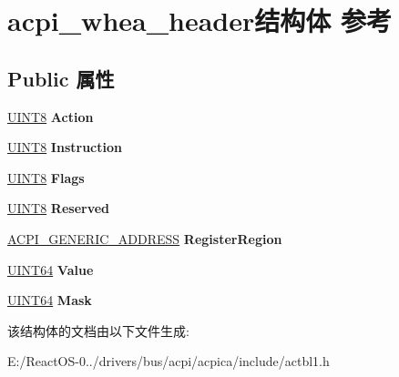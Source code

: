 \hypertarget{structacpi__whea__header}{}\section{acpi\+\_\+whea\+\_\+header结构体 参考}
\label{structacpi__whea__header}
\subsection*{Public 属性}
\begin{DoxyCompactItemize}
\item 
\mbox{\label{structacpi__whea__header_a15100555357763772a3dff52bd23ce2d}} 
\hyperlink{_processor_bind_8h_ab27e9918b538ce9d8ca692479b375b6a}{U\+I\+N\+T8} {\bfseries Action}
\item 
\mbox{\label{structacpi__whea__header_abcde372a29ea218d0800bd41bbd16935}} 
\hyperlink{_processor_bind_8h_ab27e9918b538ce9d8ca692479b375b6a}{U\+I\+N\+T8} {\bfseries Instruction}
\item 
\mbox{\label{structacpi__whea__header_af67dbf3d66879b3a9757272b22b069e5}} 
\hyperlink{_processor_bind_8h_ab27e9918b538ce9d8ca692479b375b6a}{U\+I\+N\+T8} {\bfseries Flags}
\item 
\mbox{\label{structacpi__whea__header_a6cf178d24c83bd543dfd991110f11952}} 
\hyperlink{_processor_bind_8h_ab27e9918b538ce9d8ca692479b375b6a}{U\+I\+N\+T8} {\bfseries Reserved}
\item 
\mbox{\label{structacpi__whea__header_a3141234e2c06000ec3000f419a542986}} 
\hyperlink{structacpi__generic__address}{A\+C\+P\+I\+\_\+\+G\+E\+N\+E\+R\+I\+C\+\_\+\+A\+D\+D\+R\+E\+SS} {\bfseries Register\+Region}
\item 
\mbox{\label{structacpi__whea__header_a85ccf1dfe40471f9558ba2f096fbc5cb}} 
\hyperlink{_processor_bind_8h_a57be03562867144161c1bfee95ca8f7c}{U\+I\+N\+T64} {\bfseries Value}
\item 
\mbox{\label{structacpi__whea__header_a8beedf19a98b4777102553bf9d375813}} 
\hyperlink{_processor_bind_8h_a57be03562867144161c1bfee95ca8f7c}{U\+I\+N\+T64} {\bfseries Mask}
\end{DoxyCompactItemize}


该结构体的文档由以下文件生成\+:\begin{DoxyCompactItemize}
\item 
E\+:/\+React\+O\+S-\/0../drivers/bus/acpi/acpica/include/actbl1.\+h\end{DoxyCompactItemize}
